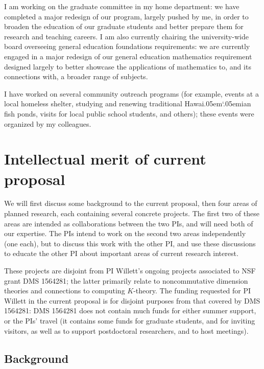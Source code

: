 \documentclass[11pt]{article}
\theoremstyle{plain}
\theoremstyle{definition}
\theoremstyle{remark}
\begin{document}
I am working on the graduate committee in my home department: we have completed a major redesign of our program, largely pushed by me, in order to broaden the education of our graduate students and better prepare them for research and teaching careers.  I am also currently chairing the university-wide board overseeing general education foundations requirements: we are currently engaged in a major redesign of our general education mathematics requirement designed largely to better showcase the applications of mathematics to, and its connections with, a broader range of subjects.

I have worked on several community outreach programs (for example, events at a local homeless shelter, studying and renewing traditional Hawai\kern.05em`\kern.05em\relax ian fish ponds, visits for local public school students, and others); these events were organized by my colleagues. 


 
 
 \section{Intellectual merit of current proposal}\label{imc}

We will first discuss some background to the current proposal, then four areas of planned research, each containing several concrete projects.  The first two of these areas are intended as collaborations between the two PIs, and will need both of our expertise.  The PIs intend to work on the second two areas independently (one each), but to discuss this work with the other PI, and use these discussions to educate the other PI about important areas of current research interest.  

These projects are disjoint from PI Willett's ongoing projects associated to NSF grant DMS 1564281; the latter primarily relate to noncommutative dimension theories and connections to computing $K$-theory.  The funding requested for PI Willett in the current proposal is for disjoint purposes from that covered by DMS 1564281: DMS 1564281 does not contain much funds for either summer support, or the PIs' travel (it contains some funds for graduate students, and for inviting visitors, as well as to support postdoctoral researchers, and to host meetings).

\subsection*{Background}
\end{document}
